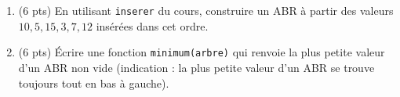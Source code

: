 \begin{enumerate}
  \item (6 pts) En utilisant \lstinline{inserer} du cours, construire un ABR à partir des valeurs $10, 5, 15, 3, 7, 12$ insérées dans cet ordre.
  \item (6 pts) Écrire une fonction \lstinline{minimum(arbre)} qui renvoie la plus petite valeur d'un ABR non vide (indication : la plus petite valeur d'un ABR se trouve toujours tout en bas à gauche).
\end{enumerate}

